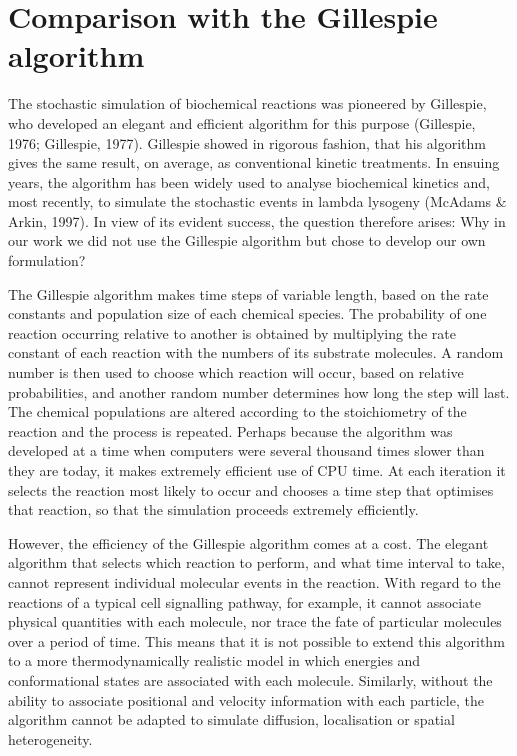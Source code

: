 \section{Comparison with the Gillespie algorithm}

The stochastic simulation of biochemical reactions was pioneered by
Gillespie, who developed an elegant and efficient algorithm for this
purpose (Gillespie, 1976; Gillespie, 1977). Gillespie showed in
rigorous fashion, that his algorithm gives the same result, on
average, as conventional kinetic treatments. In ensuing years, the
algorithm has been widely used to analyse biochemical kinetics and,
most recently, to simulate the stochastic events in lambda lysogeny
(McAdams \& Arkin, 1997). In view of its evident success, the question
therefore arises: Why in our work we did not use the Gillespie
algorithm but chose to develop our own formulation?

The Gillespie algorithm makes time steps of variable length, based on
the rate constants and population size of each chemical species. The
probability of one reaction occurring relative to another is obtained
by multiplying the rate constant of each reaction with the numbers of
its substrate molecules. A random number is then used to choose which
reaction will occur, based on relative probabilities, and another
random number determines how long the step will last. The chemical
populations are altered according to the stoichiometry of the reaction
and the process is repeated. Perhaps because the algorithm was
developed at a time when computers were several thousand times slower
than they are today, it makes extremely efficient use of CPU time. At
each iteration it selects the reaction most likely to occur and
chooses a time step that optimises that reaction, so that the
simulation proceeds extremely efficiently.

However, the efficiency of the Gillespie algorithm comes at a cost.
The elegant algorithm that selects which reaction to perform, and what
time interval to take, cannot represent individual molecular events in
the reaction. With regard to the reactions of a typical cell
signalling pathway, for example, it cannot associate physical
quantities with each molecule, nor trace the fate of particular
molecules over a period of time. This means that it is not possible to
extend this algorithm to a more thermodynamically realistic model in
which energies and conformational states are associated with each
molecule.  Similarly, without the ability to associate positional and
velocity information with each particle, the algorithm cannot be
adapted to simulate diffusion, localisation or spatial heterogeneity.

